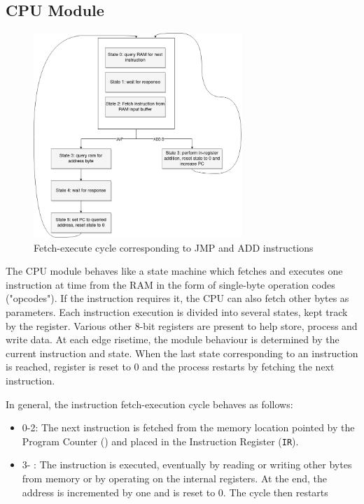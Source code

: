 \subsection{CPU Module}  \label{ssec:cpu}
\begin{figure}[hbtp]
    \centering
    \includegraphics[width=0.7\textwidth]{img/States.png}
    \caption{Fetch-execute cycle corresponding to JMP and ADD instructions}
    \label{fig:diagram}
\end{figure}

The CPU module behaves like a state machine which fetches and executes one instruction at time from the RAM in the form of single-byte operation codes ("opcodes").
If the instruction requires it, the CPU can also fetch other bytes as parameters.
Each instruction execution is divided into several states, kept track by the  register.
Various other 8-bit registers are present to help store, process and write data.
At each  edge risetime, the module behaviour is determined by the current instruction and state.
When the last state corresponding to an instruction is reached,  register is reset to 0 and the process
restarts by fetching the next instruction.

In general, the instruction fetch-execution cycle behaves as follows:
\begin{itemize}
    \item {} 0-2: The next instruction is fetched from the memory location pointed by the Program Counter () and placed in the Instruction Register (\texttt{IR}).
    \item {} 3- : The instruction is executed, eventually by reading or writing other bytes from memory or by operating on the internal registers. At the end, the  address is incremented by one and  is reset to 0. The cycle then restarts
\end{itemize}

